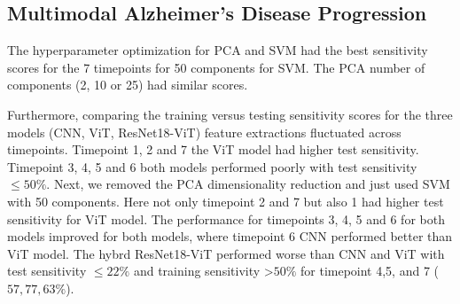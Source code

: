 

\subsection{Multimodal Alzheimer's Disease Progression}
The hyperparameter optimization for PCA and SVM had the best sensitivity scores for the 7 timepoints for 50 components for SVM. The PCA number of components (2, 10 or 25) had similar scores. 

    

Furthermore, comparing the training versus testing sensitivity scores for the three models (CNN, ViT, ResNet18-ViT) feature extractions fluctuated across timepoints. Timepoint 1, 2 and 7 the ViT model had higher test sensitivity. Timepoint 3, 4, 5 and 6 both models performed poorly with test sensitivity $ \leq 50 \%$. Next, we removed the PCA dimensionality reduction and just used SVM with 50 components. Here not only timepoint 2 and 7 but also 1 had higher test sensitivity for ViT model. The performance for timepoints 3, 4, 5 and 6 for both models improved for both models, where timepoint 6 CNN performed better than ViT model.  The hybrd ResNet18-ViT performed worse than CNN and ViT with test sensitivity $\leq 22 \% $ and training sensitivity \textgreater $50 \% $ for timepoint 4,5, and 7 ($57, 77, 63 \%$).  

